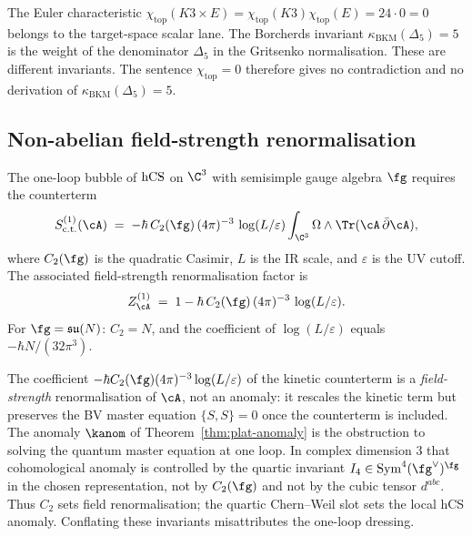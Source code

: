 \begin{remark}[Why \texorpdfstring{$\chi(K3 \times E) = 0$}{chi(K3 x E) = 0} but \texorpdfstring{$\kappa_{\mathrm{BKM}}(\Delta_5) = 5 \neq 0$}{kappa-BKM(Delta-5) = 5 != 0}]
\label{rem:phys-anom-chi-vs-weight}
The Euler characteristic $\chi_{\mathrm{top}}(K3 \times E) = \chi_{\mathrm{top}}(K3)\chi_{\mathrm{top}}(E) = 24 \cdot 0 = 0$ belongs to the target-space scalar lane. The Borcherds invariant $\kappa_{\mathrm{BKM}}(\Delta_5) = 5$ is the weight of the denominator $\Delta_5$ in the Gritsenko normalisation. These are different invariants. The sentence \(\chi_{\mathrm{top}}=0\) therefore gives no contradiction and no derivation of \(\kappa_{\mathrm{BKM}}(\Delta_5)=5\).
\end{remark}

\subsection{Non-abelian field-strength renormalisation}
\label{subsec:hcs-field-strength-renormalisation}

\begin{theorem}
\label{thm:plat-Z-counterterm}
The one-loop bubble of $\mathrm{hCS}$ on $\C^3$ with semisimple gauge algebra
$\fg$ requires the counterterm
\[
 S^{(1)}_{\mathrm{c.t.}}(\cA)
 \;=\;
 -\hbar\, C_2(\fg)\, (4\pi)^{-3}\, \log(L/\varepsilon)
 \int_{\C^3} \Omega \wedge \Tr(\cA\, \bar\partial \cA),
\]
where $C_2(\fg)$ is the quadratic Casimir, $L$ is the IR scale, and
$\varepsilon$ is the UV cutoff. The associated field-strength
renormalisation factor is
\[
 Z^{(1)}_\cA
 \;=\;
 1 - \hbar\, C_2(\fg)\, (4\pi)^{-3}\, \log(L/\varepsilon).
\]
For $\fg = \mathfrak{su}(N)$: $C_2 = N$, and the coefficient of
$\log(L/\varepsilon)$ equals $-\hbar N/(32\pi^3)$.
\end{theorem}

\begin{remark}
\label{rem:plat-Z-vs-anomaly}
The coefficient $-\hbar C_2(\fg)(4\pi)^{-3}\log(L/\varepsilon)$ of the
kinetic counterterm is a \emph{field-strength} renormalisation of $\cA$,
not an anomaly: it rescales the kinetic term but preserves the BV master
equation $\{S, S\} = 0$ once the counterterm is included. The anomaly
$\kanom$ of Theorem~\ref{thm:plat-anomaly} is the obstruction to
solving the quantum master equation at one loop. In complex dimension
$3$ that cohomological anomaly is controlled by the quartic invariant
$I_4\in\mathrm{Sym}^4(\fg^\vee)^\fg$ in the chosen representation, not
by $C_2(\fg)$ and not by the cubic tensor $d^{abc}$. Thus $C_2$ sets
field renormalisation; the quartic Chern--Weil slot sets the local hCS
anomaly. Conflating these invariants misattributes the one-loop
dressing.
\end{remark}

